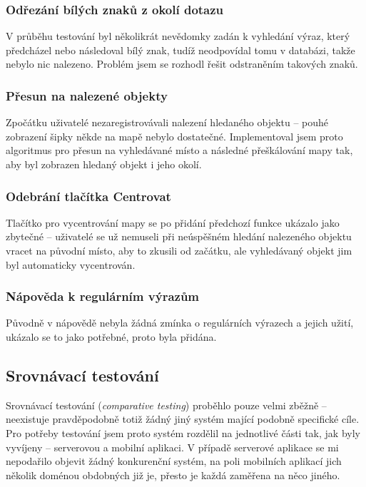 \subsubsection*{Odřezání bílých znaků z okolí dotazu}
V průběhu testování byl několikrát nevědomky zadán k vyhledání výraz, který předcházel nebo následoval bílý znak, tudíž neodpovídal tomu v databázi, takže nebylo nic nalezeno. Problém jsem se rozhodl řešit odstraněním takových znaků.
\subsubsection*{Přesun na nalezené objekty}
Zpočátku uživatelé nezaregistrovávali nalezení hledaného objektu -- pouhé zobrazení šipky někde na mapě nebylo dostatečné. Implementoval jsem proto algoritmus pro přesun na vyhledávané místo a následné přeškálování mapy tak, aby byl zobrazen hledaný objekt i jeho okolí.
\subsubsection*{Odebrání tlačítka Centrovat}
Tlačítko pro vycentrování mapy se po přidání předchozí funkce ukázalo jako zbytečné -- uživatelé se už nemuseli při neúspěšném hledání nalezeného objektu vracet na původní místo, aby to zkusili od začátku, ale vyhledávaný objekt jim byl automaticky vycentrován.
\subsubsection*{Nápověda k regulárním výrazům}
Původně v nápovědě nebyla žádná zmínka o regulárních výrazech a jejich užití, ukázalo se to jako potřebné, proto byla přidána.


\subsection{Srovnávací testování}
Srovnávací testování (\textit{comparative testing}) proběhlo pouze velmi zběžně -- neexistuje pravděpodobně totiž žádný jiný systém mající podobně specifické cíle. Pro potřeby testování jsem proto systém rozdělil na jednotlivé části tak, jak byly vyvíjeny -- serverovou a mobilní aplikaci. V případě serverové aplikace se mi nepodařilo objevit žádný konkurenční systém, na poli mobilních aplikací jich několik doménou obdobných již je, přesto je každá zaměřena na něco jiného.

